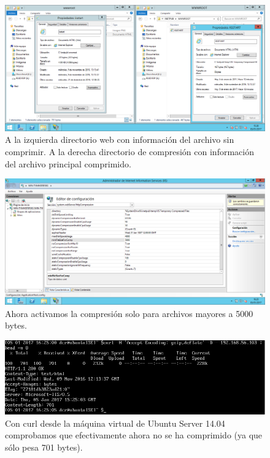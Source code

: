 \begin{figure}[H]
	\centering
	\includegraphics[scale=0.4]{iis5.png}
	\caption{A la izquierda directorio web con información del archivo sin comprimir. A la derecha directorio de compresión con información del archivo principal comprimido.}
\end{figure}

\begin{figure}[H]
	\centering
	\includegraphics[scale=0.4]{iis6.png}
	\caption{Ahora activamos la compresión solo para archivos mayores a 5000 bytes.}
\end{figure}

\begin{figure}[H]
	\centering
	\includegraphics[scale=0.6]{iis7.png}
	\caption{Con curl desde la máquina virtual de Ubuntu Server 14.04 comprobamos que efectivamente ahora no se ha comprimido (ya que sólo pesa 701 bytes).}
\end{figure}

